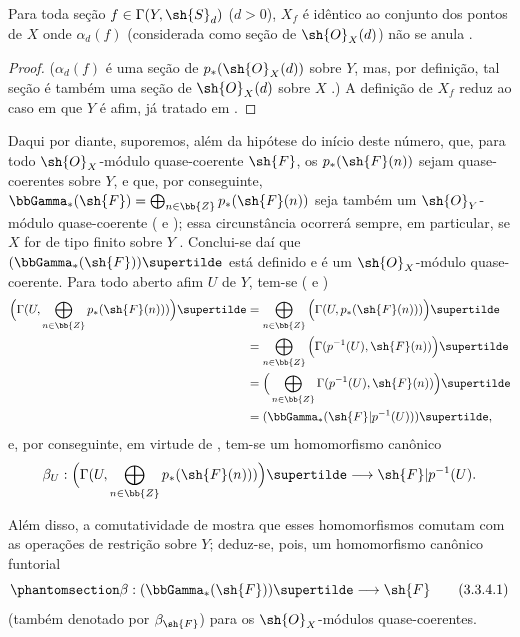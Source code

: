 \documentclass[oneside,10pt]{amsart}
\makeatletter
\newcommand{\ega@arrow}[2]{\mathchoice{#1}{#2}{#2}{#2}}
\renewcommand{\to}{\ega@arrow{\longrightarrow}{\rightarrow}}
\let\EGAOriginalLabel\label
\renewcommand{\label}[1]{\phantomsection\EGAOriginalLabel{#1}}
\makeatother
\begin{document}
\begin{proposition}[3.3.3]
\label{II.3.3.3}
Para toda seção $f\in\Gamma(Y,\sh{S}_d)$ ($d>0$), $X_f$ é idêntico ao conjunto dos pontos de $X$ onde $\alpha_d(f)$ (considerada como seção de $\sh{O}_X(d)$) não se anula .
\end{proposition}

\begin{proof}
($\alpha_d(f)$ é uma seção de $p_*(\sh{O}_X(d))$ sobre $Y$, mas, por definição, tal seção é também uma seção de $\sh{O}_X(d)$ sobre $X$ .)
A definição de $X_f$  reduz ao caso em que $Y$ é afim, já tratado em .
\end{proof}

\begin{env}[3.3.4]
\label{II.3.3.4}
Daqui por diante, suporemos, além da hipótese do início deste número, que, para todo $\sh{O}_X$-módulo quase-coerente $\sh{F}$, os $p_*(\sh{F}(n))$ sejam quase-coerentes sobre $Y$, e que, por conseguinte, $\bbGamma_*(\sh{F})=\bigoplus_{n\in\bb{Z}}p_*(\sh{F}(n))$ seja também um $\sh{O}_Y$-módulo quase-coerente ( e );
essa circunstância ocorrerá sempre, em particular, se $X$ for de tipo finito sobre $Y$ .
Conclui-se daí que $(\bbGamma_*(\sh{F}))\supertilde$ está definido e é um $\sh{O}_X$-módulo quase-coerente.
Para todo aberto afim $U$ de $Y$, tem-se ( e )
\begin{align*}
  \Big(\Gamma(U,\bigoplus_{n\in\bb{Z}}p_*(\sh{F}(n)))\Big)\supertilde
  &=\bigoplus_{n\in\bb{Z}}\Big(\Gamma(U,p_*(\sh{F}(n)))\Big)\supertilde
\\&=\bigoplus_{n\in\bb{Z}}\Big(\Gamma(p^{-1}(U),\sh{F}(n))\Big)\supertilde
\\&=\Big(\bigoplus_{n\in\bb{Z}}\Gamma(p^{-1}(U),\sh{F}(n))\Big)\supertilde
\\&=(\bbGamma_*(\sh{F}|p^{-1}(U)))\supertilde,
\end{align*}
e, por conseguinte, em virtude de , tem-se um homomorfismo canônico
\[
  \beta_U:\Big(\Gamma(U,\bigoplus_{n\in\bb{Z}}p_*(\sh{F}(n)))\Big)\supertilde\to\sh{F}|p^{-1}(U).
\]

Além disso, a comutatividade de  mostra que esses homomorfismos comutam com as operações de restrição sobre $Y$;
deduz-se, pois, um homomorfismo canônico funtorial
\[
\label{II.3.3.4.1}
  \beta:(\bbGamma_*(\sh{F}))\supertilde\to\sh{F}
\tag{3.3.4.1}
\]
(também denotado por $\beta_{\sh{F}}$) para os $\sh{O}_X$-módulos quase-coerentes.
\end{env}
\end{document}
